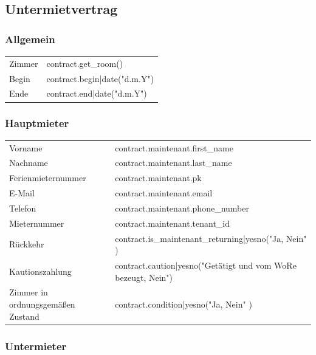 \documentclass[9pt,pdftex,a4paper]{article}
\begin{document}
%
%

\subsection*{Untermietvertrag}

\subsubsection*{Allgemein}

\begin{tabularx}{\textwidth}{XX}
Zimmer & {{ contract.get_room() }}\\
Begin & {{ contract.begin|date("d.m.Y") }}\\
Ende & {{ contract.end|date("d.m.Y") }}\\
\end{tabularx}

\subsubsection*{Hauptmieter}

\begin{tabularx}{\textwidth}{XX}
Vorname & {{ contract.maintenant.first_name }}\\
Nachname & {{ contract.maintenant.last_name }}\\
Ferienmieternummer & {{ contract.maintenant.pk }}\\
E-Mail & {{ contract.maintenant.email }}\\
Telefon & {{ contract.maintenant.phone_number }}\\
Mieternummer & {{ contract.maintenant.tenant_id }}\\
Rückkehr&  {{ contract.is_maintenant_returning|yesno("Ja, Nein" )}}\\
Kautionszahlung&  {{ contract.caution|yesno("Getätigt und vom WoRe bezeugt, Nein") }}\\
Zimmer in ordnungsgemäßen Zustand & {{ contract.condition|yesno("Ja, Nein" )}}\\
\end{tabularx}

\subsubsection*{Untermieter}
\end{document}
